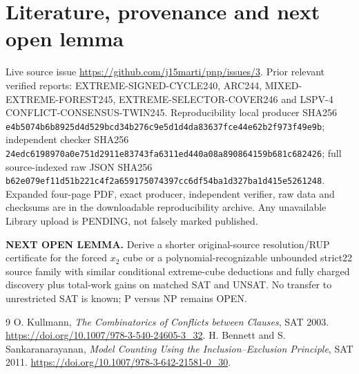 \documentclass[10pt]{article}
\begin{document}
\section{Literature, provenance and next open lemma}
Live source issue \url{https://github.com/j15marti/pnp/issues/3}. Prior relevant verified reports: EXTREME-SIGNED-CYCLE240, ARC244, MIXED-EXTREME-FOREST245, EXTREME-SELECTOR-COVER246 and LSPV-4 CONFLICT-CONSENSUS-TWIN245. Reproducibility local producer SHA256 \texttt{e4b5074b6b8925d4d529bcd34b276c9e5d1d4da83637fce44e62b2f973f49e9b}; independent checker SHA256 \texttt{24edc6198970a0e751d2911e83743fa6311ed440a08a890864159b681c682426}; full source-indexed raw JSON SHA256 \texttt{b62e079ef11d51b221c4f2a659175074397cc6df54ba1d327ba1d415e5261248}. Expanded four-page PDF, exact producer, independent verifier, raw data and checksums are in the downloadable reproducibility archive. Any unavailable Library upload is PENDING, not falsely marked published.
\par\noindent\textbf{NEXT OPEN LEMMA.} Derive a shorter original-source resolution/RUP certificate for the forced $x_2$ cube or a polynomial-recognizable unbounded strict22 source family with similar conditional extreme-cube deductions and fully charged discovery plus total-work gains on matched SAT and UNSAT. No transfer to unrestricted SAT is known; P versus NP remains OPEN.
\begin{thebibliography}{9}
 O. Kullmann, \emph{The Combinatorics of Conflicts between Clauses}, SAT 2003. \url{https://doi.org/10.1007/978-3-540-24605-3_32}.
 H. Bennett and S. Sankaranarayanan, \emph{Model Counting Using the Inclusion--Exclusion Principle}, SAT 2011. \url{https://doi.org/10.1007/978-3-642-21581-0_30}.
\end{thebibliography}
\end{document}
